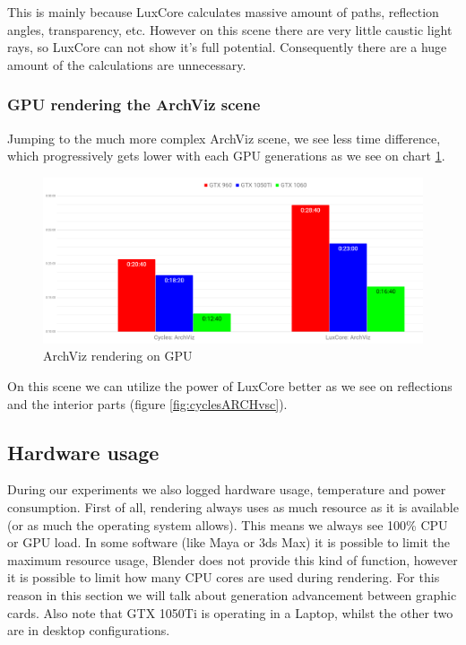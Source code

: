 \documentclass[conference]{IEEEtran}
\begin{document}
    This is mainly because LuxCore calculates massive amount of paths, reflection angles, transparency, etc. However on this scene there are very little caustic light rays, so LuxCore can not show it's full potential. Consequently there are a huge amount of the calculations are unnecessary.
    

\subsubsection{GPU rendering the ArchViz scene}
    Jumping to the much more complex ArchViz scene, we see less time difference, which progressively gets lower with each GPU generations as we see on chart \ref{fig:archviz_gpu_time}.
    
    
    \begin{figure}[htbp]
            \centering
            \includegraphics[scale=0.2]{Images/archviz_gpu_time.png}
            \caption{ArchViz rendering on GPU}
            \label{fig:archviz_gpu_time}
        \end{figure}
    On this scene we can utilize the power of LuxCore better as we see on reflections and the interior parts (figure \ref{fig:cyclesARCHvsc}).

\subsection{Hardware usage}
    During our experiments we also logged hardware usage, temperature and power consumption. First of all, rendering always uses as much resource as it is available (or as much the operating system allows). This means we always see 100\% CPU or GPU load. In some software (like Maya or 3ds Max) it is possible to limit the maximum resource usage, Blender does not provide this kind of function, however it is possible to limit how many CPU cores are used during rendering. For this reason in this section we will talk about generation advancement between graphic cards. Also note that GTX 1050Ti is operating in a Laptop, whilst the other two are in desktop configurations.
    
\end{document}
